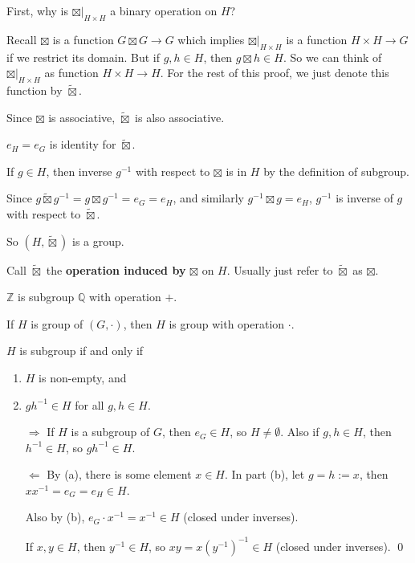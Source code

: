 \begin{pf}
First, why is $\boxtimes |_{H\times H}$ a binary operation on $H$?

Recall $\boxtimes$ is a function $G\boxtimes G\to G$ which implies $\boxtimes |_{H\times H}$ is a function $H\times H\to G$ if we restrict its domain. But if $g, h\in H$, then $g\boxtimes h\in H$. So we can think of $\boxtimes |_{H\times H}$ as function $H\times H\to H$. For the rest of this proof, we just denote this function by $\tilde{\boxtimes}$.

Since $\boxtimes$ is associative, $\tilde{\boxtimes}$ is also associative.

$e_H=e_G$ is identity for $\tilde{\boxtimes}$.

If $g\in H$, then inverse $g^{-1}$ with respect to $\boxtimes$ is in $H$ by the definition of subgroup.

Since $g\tilde{\boxtimes} g^{-1} = g\boxtimes g^{-1} = e_G = e_H$, and similarly $g^{-1}\boxtimes g = e_H$, $g^{-1}$ is inverse of $g$ with respect to $\tilde{\boxtimes}$.

So $(H,\tilde{\boxtimes})$ is a group.
\end{pf}

Call $\tilde{\boxtimes}$ the \textbf{operation induced by} $\boxtimes$ on $H$. Usually just refer to $\tilde{\boxtimes}$ as $\boxtimes$.

\begin{ex}
$\mathbb Z$ is subgroup $\mathbb Q$ with operation $+$.

If $H$ is group of $(G,\cdot)$, then $H$ is group with operation $\cdot$.
\end{ex}

\begin{prop}
$H$ is subgroup if and only if
\begin{enumerate}[label=(\alph*)]
\item $H$ is non-empty, and
\item $gh^{-1}\in H$ for all $g,h\in H$.
\end{enumerate}
\end{prop}

\begin{pfno}
\begin{itemize}
\item[$\Rightarrow$]  If $H$ is a subgroup of $G$, then $e_G\in H$, so $H\ne \emptyset$. Also if $g,h\in H$, then $h^{-1}\in H$, so $gh^{-1}\in H$.
\item[$\Leftarrow$] By (a), there is some element $x\in H$. In part (b), let $g=h:= x$, then $xx^{-1}=e_G=e_H\in H$.

Also by (b), $e_G\cdot x^{-1}=x^{-1}\in H$ (closed under inverses).

If $x,y\in H$, then $y^{-1}\in H$, so $xy = x(y^{-1})^{-1}\in H$  (closed under inverses). \qed
\end{itemize}
\end{pfno}

